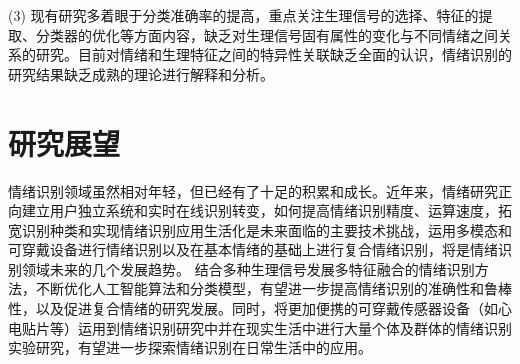 (3) 现有研究多着眼于分类准确率的提高，重点关注生理信号的选择、特征的提取、分类器的优化等方面内容，缺乏对生理信号固有属性的变化与不同情绪之间关系的研究。目前对情绪和生理特征之间的特异性关联缺乏全面的认识，情绪识别的研究结果缺乏成熟的理论进行解释和分析。


\section{研究展望}
情绪识别领域虽然相对年轻，但已经有了十足的积累和成长。近年来，情绪研究正向建立用户独立系统和实时在线识别转变，如何提高情绪识别精度、运算速度，拓宽识别种类和实现情绪识别应用生活化是未来面临的主要技术挑战，运用多模态和可穿戴设备进行情绪识别以及在基本情绪的基础上进行复合情绪识别，将是情绪识别领域未来的几个发展趋势。
结合多种生理信号发展多特征融合的情绪识别方法，不断优化人工智能算法和分类模型，有望进一步提高情绪识别的准确性和鲁棒性，以及促进复合情绪的研究发展。同时，将更加便携的可穿戴传感器设备（如心电贴片等）运用到情绪识别研究中并在现实生活中进行大量个体及群体的情绪识别实验研究，有望进一步探索情绪识别在日常生活中的应用。

\newpage
\begingroup
    \printbibliography[title={参考文献}]
\endgroup
